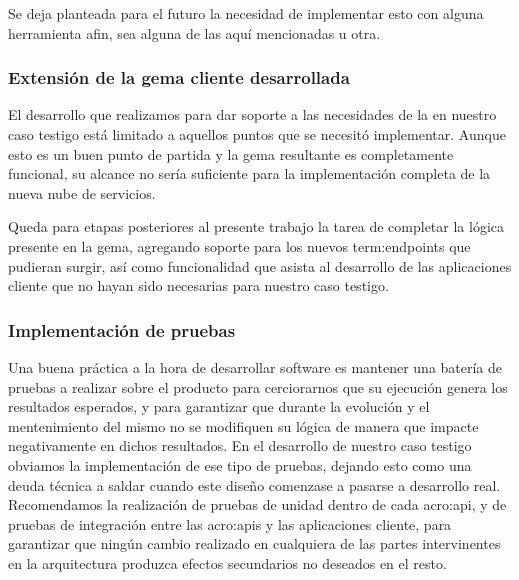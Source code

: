Se deja planteada para el futuro la necesidad de implementar esto con alguna herramienta afin, sea alguna de las aquí mencionadas u otra.

\subsubsection{Extensión de la gema cliente desarrollada}

El desarrollo que realizamos para dar soporte a las necesidades de la {\cloud} en nuestro caso testigo está limitado a aquellos puntos que se necesitó implementar. Aunque esto es un buen punto de partida y la gema resultante es completamente funcional, su alcance no sería suficiente para la implementación completa de la nueva nube de servicios.

Queda para etapas posteriores al presente trabajo la tarea de completar la lógica presente en la gema, agregando soporte para los nuevos \glspl{term:endpoint} que pudieran surgir, así como funcionalidad que asista al desarrollo de las aplicaciones cliente que no hayan sido necesarias para nuestro caso testigo.

\subsubsection{Implementación de pruebas}

Una buena práctica a la hora de desarrollar software es mantener una batería de pruebas a realizar sobre el producto para cerciorarnos que su ejecución genera los resultados esperados, y para garantizar que durante la evolución y el mentenimiento del mismo no se modifiquen su lógica de manera que impacte negativamente en dichos resultados. En el desarrollo de nuestro caso testigo obviamos la implementación de ese tipo de pruebas, dejando esto como una deuda técnica a saldar cuando este diseño comenzase a pasarse a desarrollo real. Recomendamos la realización de pruebas de unidad dentro de cada \gls{acro:api}, y de pruebas de integración entre las \glspl{acro:api} y las aplicaciones cliente, para garantizar que ningún cambio realizado en cualquiera de las partes intervinentes en la arquitectura produzca efectos secundarios no deseados en el resto.
